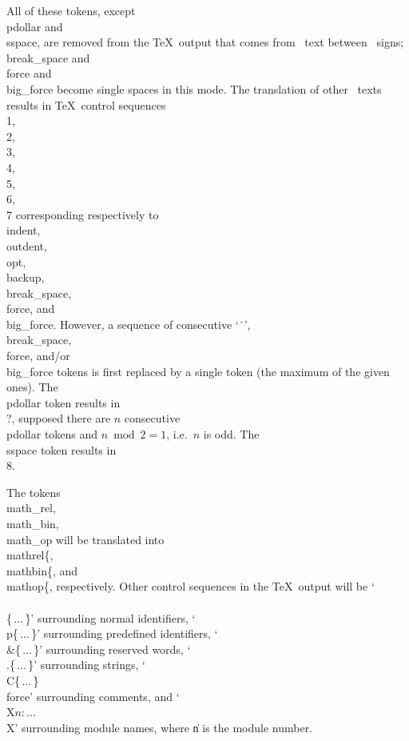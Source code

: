 \yskip\noindent All of these tokens, except \\{pdollar} and \\{sspace},  are
removed from the \TeX\ output that
comes from \ADA\ text between \ab\ signs; \\{break\_space} and \\{force} and
\\{big\_force} become single spaces in this mode. The translation of other
\ADA\ texts results in \TeX\ control sequences \.{\\1}, \.{\\2},
\.{\\3}, \.{\\4}, \.{\\5}, \.{\\6}, \.{\\7} corresponding respectively to
\\{indent}, \\{outdent}, \\{opt}, \\{backup}, \\{break\_space}, \\{force}, and
\\{big\_force}. However, a sequence of consecutive `\.\ ', \\{break\_space},
\\{force}, and/or \\{big\_force} tokens is first replaced by a single token
(the maximum of the given ones). The \\{pdollar} token results in \.{\\?},
supposed there are $n$ consecutive \\{pdollar} tokens and $n\bmod2=1$, i.e.\
$n$ is odd. The \\{sspace} token results in \.{\\8}.

The tokens \\{math\_rel}, \\{math\_bin}, \\{math\_op} will be translated into
\.{\\mathrel\{}, \.{\\mathbin\{}, and \.{\\mathop\{}, respectively.
Other control sequences in the \TeX\ output will be
`\.{\\\\\{}$\,\ldots\,$\.\}' surrounding normal identifiers,
`\.{\\p\{}$\,\ldots\,$\.\}' surrounding predefined identifiers,
`\.{\\\&\{}$\,\ldots\,$\.\}' surrounding reserved words,
`\.{\\.\{}$\,\ldots\,$\.\}' surrounding strings,
`\.{\\C\{}$\,\ldots\,$\.\}$\,$\\{force}' surrounding comments, and
`\.{\\X$n$:}$\,\ldots\,$\.{\\X}' surrounding module names, where
\|n is the module number.

